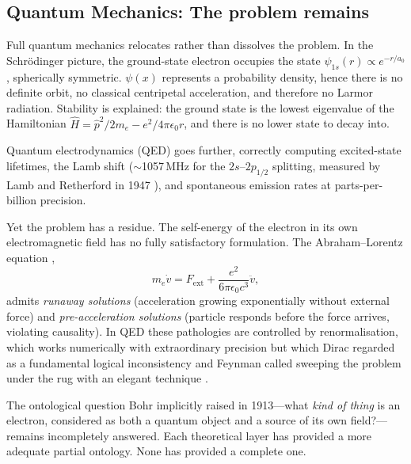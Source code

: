 \subsection{Quantum Mechanics: The problem remains}

Full quantum mechanics relocates rather than dissolves the problem. In the Schr\"{o}dinger picture, the ground-state electron occupies the state $\psi_{1s}(r) \propto e^{-r/a_0}$, spherically symmetric. $\psi(x)$ represents a probability density, hence there is no definite orbit, no classical centripetal acceleration, and therefore no Larmor radiation. Stability is explained: the ground state is the lowest eigenvalue of the Hamiltonian $\hat{H} = \hat{p}^2/2m_e - e^2/4\pi\epsilon_0 r$, and there is no lower state to decay into.

\medskip

Quantum electrodynamics (QED) goes further, correctly computing excited-state lifetimes, the Lamb shift ($\sim$1057\,MHz for the $2s$--$2p_{1/2}$ splitting, measured by Lamb and Retherford in 1947 \cite{lamb_1947_finestructure}), and spontaneous emission rates at parts-per-billion precision.

\medskip

Yet the problem has a residue. The self-energy of the electron in its own electromagnetic field has no fully satisfactory formulation. The Abraham--Lorentz equation \cite{abraham_1903_dynamik, lorentz_1904_electromagnetic, dirac_1938_radiating},
\begin{equation}
  m_e \dot{v} = F_{\mathrm{ext}} + \frac{e^2}{6\pi\epsilon_0 c^3}\ddot{v},
  \label{eq:AL}
\end{equation}
admits \textit{runaway solutions} (acceleration growing exponentially without external force) and \textit{pre-acceleration solutions} (particle responds before the force arrives, violating causality). In QED these pathologies are controlled by renormalisation, which works numerically with extraordinary precision but which Dirac regarded as a fundamental logical inconsistency \cite{dirac_1938_radiating} and Feynman called sweeping the problem under the rug with an elegant technique \cite{feynman_1985_qed}.

\medskip

The ontological question Bohr implicitly raised in 1913---what \textit{kind of thing} is an electron, considered as both a quantum object and a source of its own field?---remains incompletely answered. Each theoretical layer has provided a more adequate partial ontology. None has provided a complete one.

